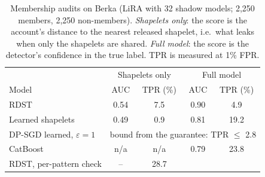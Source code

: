 \begin{table}[t]
\caption{Membership audits on Berka (LiRA with 32 shadow models; 2,250 members, 2,250 non-members). \emph{Shapelets only}: the score is the account's distance to the nearest released shapelet, i.e.\ what leaks when only the shapelets are shared. \emph{Full model}: the score is the detector's confidence in the true label. TPR is measured at 1\% FPR.}
\label{tab:lira}
\small\setlength{\tabcolsep}{3pt}
\centering
\begin{tabular}{lcccc}
\toprule
& \multicolumn{2}{c}{Shapelets only} & \multicolumn{2}{c}{Full model} \\
Model & AUC & TPR (\%) & AUC & TPR (\%) \\
\midrule
RDST & 0.54 & 7.5 & 0.90 & 4.9 \\
Learned shapelets & 0.49 & 0.9 & 0.81 & 19.2 \\
DP-SGD learned, $\varepsilon{=}1$ & \multicolumn{4}{c}{bound from the guarantee: TPR $\leq$ 2.8} \\
CatBoost & n/a & n/a & 0.79 & 23.8 \\
\midrule
RDST, per-pattern check & -- & 28.7 & & \\
\bottomrule\end{tabular}\end{table}
